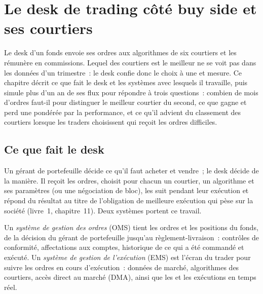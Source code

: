 \chapter{Le desk de trading côté buy side et ses courtiers}\label{ch:mx:the-buy-side-trading-desk-and-its-brokers}

Le desk d'un fonds envoie ses ordres aux algorithmes de six courtiers et les rémunère en commissions. Lequel des courtiers est le meilleur ne se voit pas dans les données d'un trimestre~: le desk confie donc le choix à une
 et mesure. Ce chapitre décrit ce que fait le desk et les systèmes avec lesquels il travaille, puis simule plus d'un an de ses flux pour
répondre à trois questions~: combien de mois d'ordres faut-il pour distinguer le meilleur courtier du second, ce que gagne et perd une
 pondérée par la performance, et ce qu'il advient du classement des courtiers lorsque les traders choisissent qui reçoit les ordres difficiles.

\section{Ce que fait le desk}

Un gérant de portefeuille décide ce qu'il faut acheter et vendre~; le desk décide de la manière. Il reçoit les ordres, choisit pour chacun un courtier, un algorithme et
ses paramètres (ou une négociation de bloc), les suit pendant leur exécution et répond du résultat au titre de l'obligation de meilleure exécution qui pèse sur la société
(livre~1, chapitre~11). Deux systèmes portent ce travail.

\begin{definition}\label{def:mx:the-buy-side-trading-desk-and-its-brokers:oms}
Un \emph{système de gestion des ordres} (OMS) tient les ordres et les positions du fonds, de la décision du gérant de portefeuille jusqu'au
règlement-livraison~: contrôles de conformité, affectations aux comptes, historique de ce qui a été commandé et exécuté. Un
\emph{système de gestion de l'exécution} (EMS) est l'écran du trader pour suivre les ordres en cours d'exécution~: données de marché, algorithmes des courtiers, accès direct au marché (DMA), ainsi que les  et les
exécutions en temps réel.
\end{definition}

